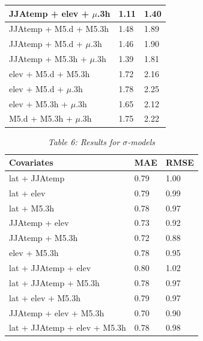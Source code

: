\documentclass[12pt,a4paper,english]{article}
\begin{document}
\begin{singlespace}
\begin{table}
\begin{minipage}[b]{0.33\linewidth}
\begin{tabular}{|l|l|l|}
	\hline	
	\rowcolor{Gray}
	JJAtemp + elev + $\mu$.3h & 1.11 & 1.40 \\
	\hline
	JJAtemp + M5.d + M5.3h & 1.48 & 1.89 \\
	\hline
	JJAtemp + M5.d + $\mu$.3h & 1.46 & 1.90 \\
	\hline 
	JJAtemp + M5.3h + $\mu$.3h & 1.39 & 1.81 \\
	\hline
	elev + M5.d + M5.3h & 1.72 & 2.16 \\
	\hline
	elev + M5.d + $\mu$.3h & 1.78 & 2.25 \\
	\hline 
	elev + M5.3h + $\mu$.3h & 1.65 & 2.12 \\
	\hline
	M5.d + M5.3h + $\mu$.3h & 1.75 & 2.22 \\
   \hline
   \hline
\end{tabular}
\vspace{20mm}
\end{minipage}
\end{table}
\end{singlespace}

\clearpage

\begin{table}[hbtp]
\small
\caption*{\sl Table 6: Results for $\sigma$-models}
\centering
  \begin{tabular}{|l|l|l|}
    \hline
    \hline
    \textbf{Covariates}& \textbf{MAE} & \textbf{RMSE} \\
	\hline
	\hline
	lat + JJAtemp & 0.79 & 1.00 \\
	\hline
	lat + elev & 0.79 & 0.99 \\
	\hline
	lat + M5.3h & 0.78 & 0.97 \\
	\hline
	JJAtemp + elev & 0.73 & 0.92 \\
	\hline
	\rowcolor{DarkGray}
	JJAtemp + M5.3h & 0.72 & 0.88 \\
	\hline
	elev + M5.3h & 0.78 & 0.95 \\
	\hline
	lat + JJAtemp + elev & 0.80 & 1.02 \\
	\hline
	lat + JJAtemp + M5.3h & 0.78 & 0.97 \\
	\hline
	lat + elev + M5.3h & 0.79 & 0.97 \\
	\hline
	\rowcolor{Gray}
	JJAtemp + elev + M5.3h & 0.70 & 0.90 \\
	\hline
	lat + JJAtemp + elev + M5.3h & 0.78 & 0.98 \\
   \hline
   \hline
\end{tabular}
\end{table}
\end{document}
